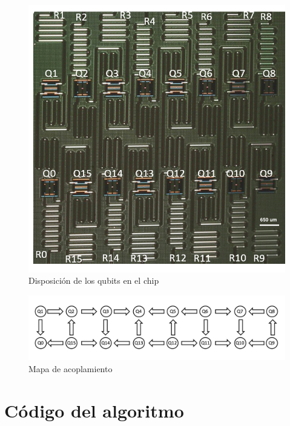 \documentclass{article}
\begin{document}
\begin{center}
\begin{figure}[H]
    \centering
    \includegraphics[scale=0.4]{img/ibmqx3-labeled.png}
    \caption{Disposición de los qubits en el chip}
    \label{fig:5}
\end{figure}
\end{center}

\begin{center}
\begin{figure}[H]
    \centering
    \includegraphics[scale=0.5]{img/IBMQX5_connections_full.png}
    \caption{Mapa de acoplamiento}
    \label{fig:6}
\end{figure}
\end{center}

\section*{Código del algoritmo}
\end{document}
